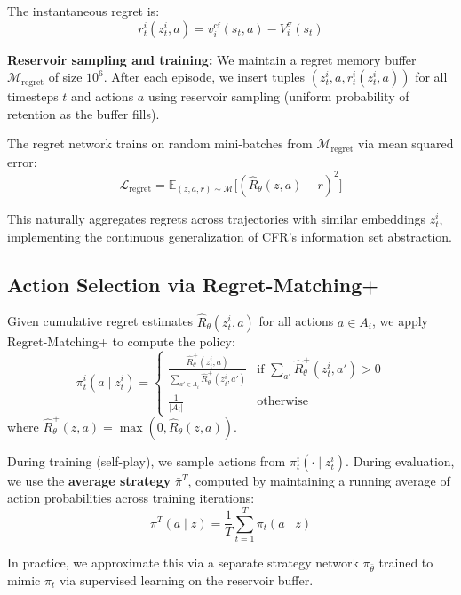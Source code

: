 \documentclass{article}
\begin{document}
The instantaneous regret is:
\begin{equation}
r_t^i(z_t^i, a) = v_i^{\text{cf}}(s_t, a) - V_i^\sigma(s_t)
\end{equation}

\textbf{Reservoir sampling and training:} We maintain a regret memory buffer $\mathcal{M}_{\text{regret}}$ of size $10^6$. After each episode, we insert tuples $(z_t^i, a, r_t^i(z_t^i, a))$ for all timesteps $t$ and actions $a$ using reservoir sampling (uniform probability of retention as the buffer fills).

The regret network trains on random mini-batches from $\mathcal{M}_{\text{regret}}$ via mean squared error:
\begin{equation}
\mathcal{L}_{\text{regret}} = \mathbb{E}_{(z, a, r) \sim \mathcal{M}} \big[(\hat{R}_\theta(z, a) - r)^2\big]
\end{equation}

This naturally aggregates regrets across trajectories with similar embeddings $z_t^i$, implementing the continuous generalization of CFR's information set abstraction.

\subsection{Action Selection via Regret-Matching+}

Given cumulative regret estimates $\hat{R}_\theta(z_t^i, a)$ for all actions $a \in A_i$, we apply Regret-Matching+ to compute the policy:
\begin{equation}
\pi_t^i(a \mid z_t^i) = \begin{cases}
\frac{\hat{R}_\theta^+(z_t^i, a)}{\sum_{a' \in A_i} \hat{R}_\theta^+(z_t^i, a')} & \text{if } \sum_{a'} \hat{R}_\theta^+(z_t^i, a') > 0 \\
\frac{1}{|A_i|} & \text{otherwise}
\end{cases}
\end{equation}
where $\hat{R}_\theta^+(z, a) = \max(0, \hat{R}_\theta(z, a))$.

During training (self-play), we sample actions from $\pi_t^i(\cdot \mid z_t^i)$. During evaluation, we use the \textbf{average strategy} $\bar{\pi}^T$, computed by maintaining a running average of action probabilities across training iterations:
\begin{equation}
\bar{\pi}^T(a \mid z) = \frac{1}{T} \sum_{t=1}^T \pi_t(a \mid z)
\end{equation}

In practice, we approximate this via a separate strategy network $\pi_{\bar{\theta}}$ trained to mimic $\pi_t$ via supervised learning on the reservoir buffer.
\end{document}
